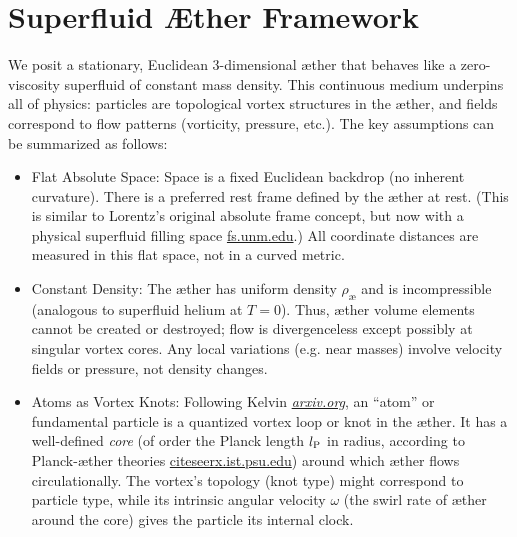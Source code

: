\documentclass[aps,preprint,superscriptaddress]{revtex4}
\begin{document}
    \section*{Superfluid Æther Framework}

    We posit a stationary, Euclidean 3-dimensional æther that behaves like a zero-viscosity superfluid of constant mass density. This continuous medium underpins all of physics: particles are topological vortex structures in the æther, and fields correspond to flow patterns (vorticity, pressure, etc.). The key assumptions can be summarized as follows:

    \begin{itemize}
        \item
        Flat Absolute Space: Space is a fixed Euclidean backdrop (no inherent curvature). There is a preferred rest frame defined by the æther at rest. (This is similar to Lorentz’s original absolute frame concept, but now with a physical superfluid filling space
        \href{https://fs.unm.edu/QuantizationDiscretization.pdf#:~:text=Winterberg%20,an%20equal%20number%20of%20positive}{fs.unm.edu}.) All coordinate distances are measured in this flat space, not in a curved metric.

        \item
        Constant Density: The æther has uniform density $\rho_\text{\ae}$ and is incompressible (analogous to superfluid helium at $T=0$). Thus, æther volume elements cannot be created or destroyed; flow is divergenceless except possibly at singular vortex cores. Any local variations (e.g. near masses) involve velocity fields or pressure, not density changes.

        \item
        Atoms as Vortex Knots: Following Kelvin
        \href{https://arxiv.org/pdf/2012.07395#:~:text=Thomson%20,on%20the%20right%20path%20when}{\textit{arxiv.org}}, an “atom” or fundamental particle is a quantized vortex loop or knot in the æther. It has a well-defined \textit{core} (of order the Planck length $l_{\textrm P}$ in radius, according to Planck-æther theories
        \href{https://citeseerx.ist.psu.edu/document?repid=rep1&type=pdf&doi=25483f1ebc9dc442a9f1505a49d96eb35e92e3f4#:~:text=45,on%20General%20Relativity%20and%20Relativistic}{citeseerx.ist.psu.edu}) around which æther flows circulationally. The vortex’s topology (knot type) might correspond to particle type, while its intrinsic angular velocity $\omega$ (the swirl rate of æther around the core) gives the particle its internal clock.


\end{itemize}
\end{document}
